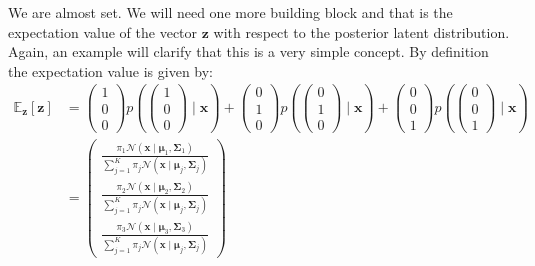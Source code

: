 We are almost set. We will need one more building block and that is the expectation value of the vector $\boldsymbol{z}$ with respect to the posterior latent
distribution. Again, an example will clarify that this is a very simple concept. By definition the expectation  value is given by:
\begin{align}
\mathbb{E}_{\boldsymbol{z}}[\boldsymbol{z}] &= 
\left( \begin{array}{c} 1 \\ 0 \\ 0 \end{array} \right)p(\left( \begin{array}{c} 1 \\ 0 \\ 0 \end{array} \right)  \mid \boldsymbol{x} ) +  \left( \begin{array}{c} 0 \\ 1 \\ 0 \end{array} \right)p(\left( \begin{array}{c} 0 \\ 1 \\ 0 \end{array} \right) \mid \boldsymbol{x} ) +  \left( \begin{array}{c} 0 \\ 0 \\ 1 \end{array} \right)p(\left( \begin{array}{c} 0 \\ 0 \\ 1 \end{array} \right)  \mid \boldsymbol{x} ) \nonumber \\
& = \left(\begin{array}{c} \frac{\pi_1 \mathcal{N}(\boldsymbol{x}\mid \boldsymbol{\mu}_1, \boldsymbol{\Sigma}_1)}{\sum^K_{j=1} \pi_j \mathcal{N}(\boldsymbol{x} \mid \boldsymbol{\mu}_j, \boldsymbol{\Sigma}_j)} \\ \frac{\pi_2 \mathcal{N}(\boldsymbol{x} \mid \boldsymbol{\mu}_2, \boldsymbol{\Sigma}_2)}{\sum^K_{j=1} \pi_j \mathcal{N}(\boldsymbol{x} \mid \boldsymbol{\mu}_j, \boldsymbol{\Sigma}_j)} \\ \frac{\pi_3\mathcal{N}(\boldsymbol{x} \mid \boldsymbol{\mu}_3, \boldsymbol{\Sigma}_3)}{\sum^K_{j=1} \pi_j \mathcal{N}(\boldsymbol{x} \mid \boldsymbol{\mu}_j, \boldsymbol{\Sigma}_j)} \end{array} \right)
\end{align}

